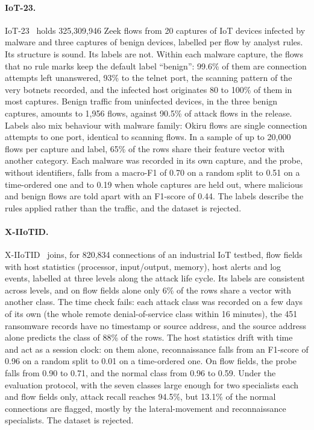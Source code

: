 \paragraph{IoT-23.}
IoT-23~\cite{garcia2020iot23} holds 325{,}309{,}946 Zeek flows from 20 captures of IoT
devices infected by malware and three captures of benign devices, labelled per flow by
analyst rules. Its structure is sound. Its labels are not. Within each malware capture,
the flows that no rule marks keep the default label ``benign'': 99.6\% of them are
connection attempts left unanswered, 93\% to the telnet port, the scanning pattern of the
very botnets recorded, and the infected host originates 80 to 100\% of them in most
captures. Benign traffic from uninfected devices, in the three benign captures, amounts to
1{,}956 flows, against 90.5\% of attack flows in the release. Labels also mix behaviour
with malware family: Okiru flows are single connection attempts to one port, identical to
scanning flows. In a sample of up to 20{,}000 flows per capture and label, 65\% of the rows
share their feature vector with another category. Each malware was recorded in its own
capture, and the probe, without identifiers, falls from a macro-F1 of 0.70 on a random
split to 0.51 on a time-ordered one and to 0.19 when whole captures are held out, where
malicious and benign flows are told apart with an F1-score of 0.44. The labels describe
the rules applied rather than the traffic, and the dataset is rejected.

\paragraph{X-IIoTID.}
X-IIoTID~\cite{alhawawreh2022xiiotid} joins, for 820{,}834 connections of an industrial
IoT testbed, flow fields with host statistics (processor, input/output, memory), host
alerts and log events, labelled at three levels along the attack life cycle. Its labels
are consistent across levels, and on flow fields alone only 6\% of the rows share a vector
with another class. The time check fails: each attack class was recorded on a few days of
its own (the whole remote denial-of-service class within 16 minutes), the 451
ransomware records have no timestamp or source address, and the source address alone
predicts the class of 88\% of the rows. The host statistics drift with time and act as a
session clock: on them alone, reconnaissance falls from an F1-score of 0.96 on a random
split to 0.01 on a time-ordered one. On flow fields, the probe falls from 0.90 to 0.71,
and the normal class from 0.96 to 0.59. Under the evaluation protocol, with the seven
classes large enough for two specialists each and flow fields only, attack recall reaches
94.5\%, but 13.1\% of the normal connections are flagged, mostly by the lateral-movement
and reconnaissance specialists. The dataset is rejected.


